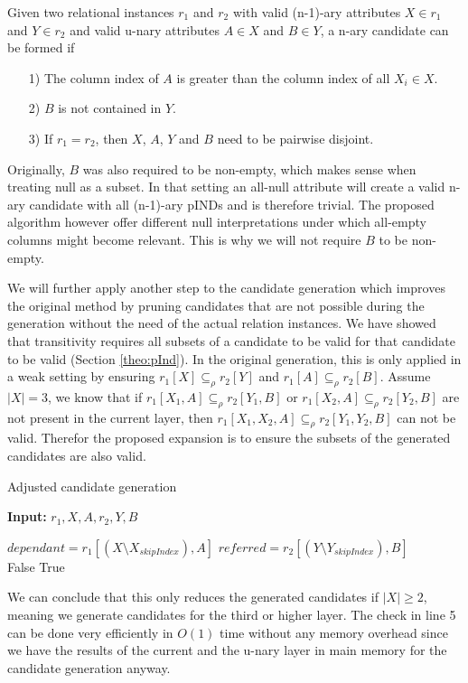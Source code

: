 \noindent \newline Given two relational instances $r_1$ and $r_2$ with valid (n-1)-ary attributes $X \in r_1$ and $Y \in r_2$ and valid u-nary attributes $A \in X$ and $B \in Y$, a n-ary candidate can be formed if
\begin{itemize}
    \item[1)] The column index of $A$ is greater than the column index of all $X_i \in X$.
    \item[2)] $B$ is not contained in $Y$.
    \item[3)] If $r_1 = r_2$, then $X$, $A$, $Y$ and $B$ need to be pairwise disjoint.
\end{itemize}
Originally, $B$ was also required to be non-empty, which makes sense when treating null as a subset. In that setting an all-null attribute will create a valid n-ary candidate with all (n-1)-ary pINDs and is therefore trivial. The proposed algorithm however offer different null interpretations under which all-empty columns might become relevant. This is why we will not require $B$ to be non-empty.

\noindent \newline We will further apply another step to the candidate generation which improves the original method by pruning candidates that are not possible during the generation without the need of the actual relation instances. We have showed that transitivity requires all subsets of a candidate to be valid for that candidate to be valid (Section \ref{theo:pInd}). In the original generation, this is only applied in a weak setting by ensuring $r_1[X] \subseteq_\rho r_2[Y]$ and $r_1[A] \subseteq_\rho r_2[B]$. Assume $|X| = 3$, we know that if $r_1[X_1, A] \subseteq_\rho r_2[Y_1, B]$ or $r_1[X_2, A] \subseteq_\rho r_2[Y_2, B]$ are not present in the current layer, then $r_1[X_1, X_2, A] \subseteq_\rho r_2[Y_1, Y_2, B]$ can not be valid. Therefor the proposed expansion is to ensure the subsets of the generated candidates are also valid.
\begin{algorithm}
    \caption{Adjusted candidate generation}\label{alg:canditate_gen}
    \hspace*{\algorithmicindent} \textbf{Input:} $r_1, X, A, r_2, Y, B$
    \begin{algorithmic}[1]
        \State $dependant = r_1[(X \setminus X_{skipIndex}), A]$
        \State $referred = r_2[(Y \setminus Y_{skipIndex}), B]$ \\
            \State \Return False
        \EndIf
    \EndFor
    \State \Return True
    \end{algorithmic}
\end{algorithm}

\noindent We can conclude that this only reduces the generated candidates if $|X| \geq 2$, meaning we generate candidates for the third or higher layer. The check in line 5 can be done very efficiently in $O(1)$ time without any memory overhead since we have the results of the current and the u-nary layer in main memory for the candidate generation anyway.